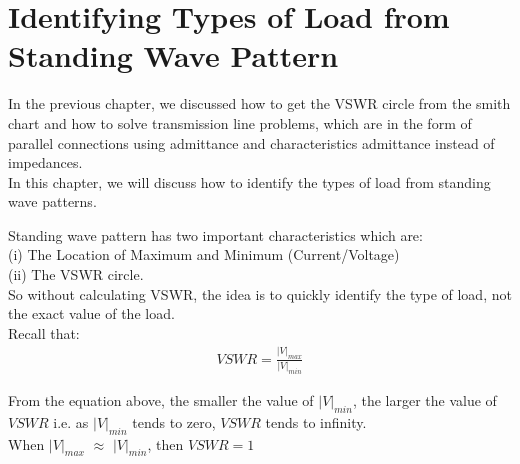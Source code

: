 \chapter{Identifying Types of Load from Standing Wave Pattern}

In the previous chapter, we discussed how to get the VSWR circle from the smith chart and how to solve transmission line problems, which are in the form of parallel connections using admittance and characteristics admittance instead of impedances.\\
In this chapter, we will discuss how to identify the types of load from standing wave patterns.

Standing wave pattern has two important characteristics which are:\\
(i) The Location of Maximum and Minimum (Current/Voltage)\\
(ii) The VSWR circle.\\
So without calculating VSWR, the idea is to quickly identify the type of load, not the exact value of the load.\\
Recall that:\\
\begin{align}
VSWR = \frac{|V|_{max}}{|V|_{min}}
\end{align}

From the equation above, the smaller the value of $|V|_{min}$, the larger the value of ${VSWR}$ i.e. as $|V|_{min}$ tends to zero, ${VSWR}$ tends to infinity.\\
When $|V|_{max}$ ${\approx}$ $|V|_{min}$, then $VSWR = 1$\\

